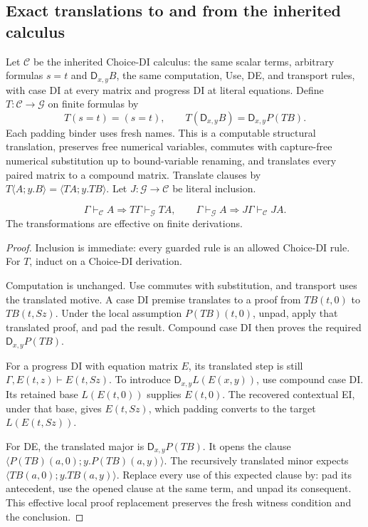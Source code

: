 \subsection{Exact translations to and from the inherited calculus}

Let $\mathcal C$ be the inherited Choice-DI calculus: the same scalar
terms, arbitrary formulas $s=t$ and $\mathsf D_{x,y}B$, the same
computation, Use, DE, and transport rules, with case DI at every matrix
and progress DI at literal equations.  Define $T:\mathcal C\to\mathcal G$
on finite formulas by
\[
 T(s=t)=(s=t),\qquad
 T(\mathsf D_{x,y}B)=\mathsf D_{x,y}P(TB).
\tag{Translation}\label{eq:guarded-translation}
\]
Each padding binder uses fresh names.  This is a computable structural
translation, preserves free numerical variables, commutes with
capture-free numerical substitution up to bound-variable renaming,
and translates every paired matrix to a compound matrix.
Translate clauses by
$T\langle A;y.B\rangle=\langle TA;y.TB\rangle$.
Let $J:\mathcal G\to\mathcal C$ be literal inclusion.

\begin{theorem}
\[
 \Gamma\vdash_{\mathcal C}A\Longrightarrow
 T\Gamma\vdash_{\mathcal G}TA,
 \qquad
 \Gamma\vdash_{\mathcal G}A\Longrightarrow
 J\Gamma\vdash_{\mathcal C}JA.
\]
The transformations are effective on finite derivations.
\end{theorem}
\begin{proof}
Inclusion is immediate: every guarded rule is an allowed Choice-DI
rule.  For $T$, induct on a Choice-DI derivation.

Computation is unchanged.  Use commutes with substitution, and
transport uses the translated motive.  A case DI premise translates
to a proof from $TB(t,0)$ to $TB(t,Sz)$.  Under the local assumption
$P(TB)(t,0)$, unpad, apply that translated proof, and pad the result.
Compound case DI then proves the required
$\mathsf D_{x,y}P(TB)$.

For a progress DI with equation matrix $E$, its translated step is
still $\Gamma,E(t,z)\vdash E(t,Sz)$.  To introduce
$\mathsf D_{x,y}L(E(x,y))$, use compound case DI.  Its retained base
$L(E(t,0))$ supplies $E(t,0)$.  The recovered contextual EI, under
that base, gives $E(t,Sz)$, which padding converts to the target
$L(E(t,Sz))$.

For DE, the translated major is $\mathsf D_{x,y}P(TB)$.
It opens the clause
$\langle P(TB)(a,0);y.P(TB)(a,y)\rangle$.
The recursively translated minor expects
$\langle TB(a,0);y.TB(a,y)\rangle$.  Replace every use of this
expected clause by: pad its antecedent, use the opened clause at the
same term, and unpad its consequent.  This effective local proof
replacement preserves the fresh witness condition and the conclusion.
\end{proof}

